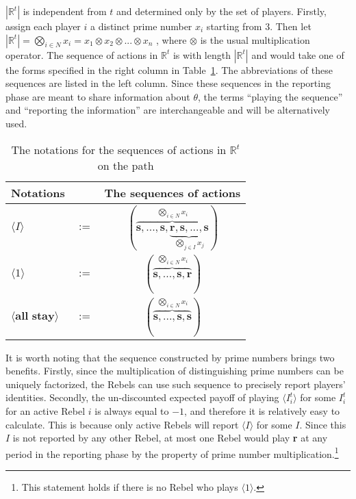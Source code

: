 \documentclass[12pt,letter]{article}
\newcommand{\Omicron}{\mathbb{R}}
\theoremstyle{definition}
\theoremstyle{definition}
\theoremstyle{remark}
\theoremstyle{claim}
\begin{document}
$|\Omicron^{t}|$ is independent from $t$ and determined only by the set of players. Firstly, assign each player $i$ a distinct prime number $x_i$ starting from $3$. Then let $|\Omicron^{t}|=\bigotimes_{i\in N} x_i=x_1\otimes x_2\otimes...\otimes x_n$ , where $\otimes$ is the usual multiplication operator. The sequence of actions in $\Omicron^{t}$ is with length $|\Omicron^t|$ and would take one of the forms specified in the right column in Table~\ref{Table_msg_form}. The abbreviations of these sequences are listed in the left column. Since these sequences in the reporting phase are meant to share information about $\theta$, the terms ``playing the sequence'' and ``reporting the information'' are interchangeable and will be alternatively used.


\begin{table}[!htbp]
\caption{The notations for the sequences of actions in $\Omicron^t$ on the path}
\label{Table_msg_form}
\begin{center}
\begin{tabular}{l c c}
Notations && The sequences of actions\\
\hline
\hline
$\langle  I \rangle$ 				& $:=$ 			& $(\overbrace{\textbf{s},...,\textbf{s},\underbrace{\textbf{r},\textbf{s},...,\textbf{s}}_{\bigotimes_{j\in I}x_j} }^{\bigotimes_{i\in N} x_i})$  \\
$\langle 1 \rangle$	 					& $:=$ 			& $( \overbrace{\textbf{s},...,\textbf{s},{\textbf{r}} }^{\bigotimes_{i\in N} x_i} )$  \\
$\langle \textbf{all stay} \rangle$	 					& $:=$ 			& $(\overbrace{ \textbf{s},...,\textbf{s},{\textbf{s}} }^{\bigotimes_{i\in N} x_i})$  \\
\hline
\end{tabular}
\end{center}
\end{table}


It is worth noting that the sequence constructed by prime numbers brings two benefits. Firstly, since the multiplication of distinguishing prime numbers can be uniquely factorized, the Rebels can use such sequence to precisely report players' identities. Secondly, the un-discounted expected payoff of playing $\langle I^t_i \rangle$ for some $I^t_i$ for an active Rebel $i$ is always equal to $-1$, and therefore it is relatively easy to calculate. This is because only active Rebels will report $\langle I \rangle$ for some $I$. Since this $I$ is not reported by any other Rebel, at most one Rebel would play \textbf{r} at any period in the reporting phase by the property of prime number multiplication.\footnote{This statement holds if there is no Rebel who plays $\langle 1 \rangle$.} 
\end{document}
